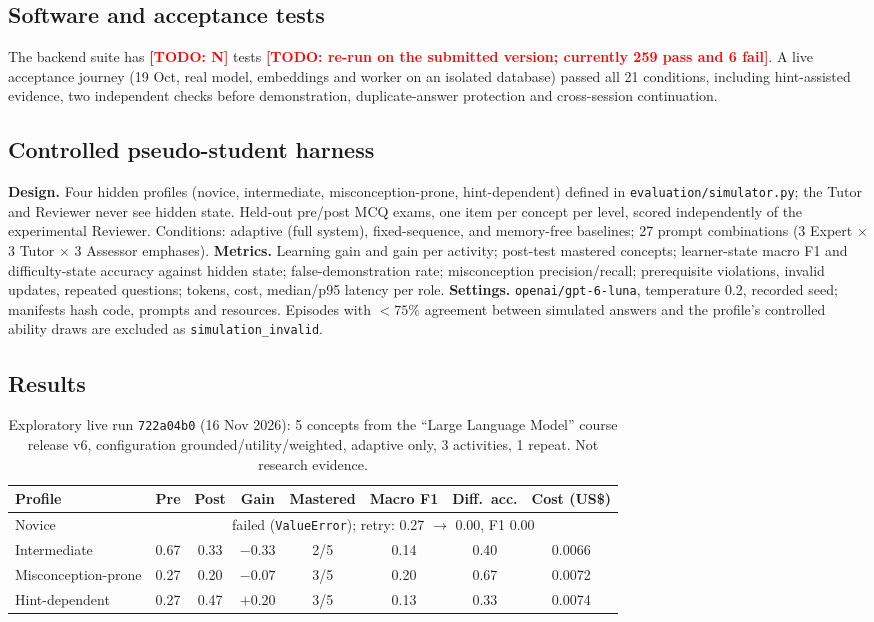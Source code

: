 \documentclass{article}
\newcommand{\todo}[1]{\textcolor{red}{\textbf{[TODO: #1]}}}
\newcommand{\code}[1]{\texttt{\small #1}}
\begin{document}
\subsection{Software and acceptance tests}
The backend suite has \todo{N} tests \todo{re-run on the submitted version; currently 259 pass and 6 fail}. A live acceptance journey (19 Oct, real model, embeddings and worker on an isolated database) passed all 21 conditions, including hint-assisted evidence, two independent checks before demonstration, duplicate-answer protection and cross-session continuation.

\subsection{Controlled pseudo-student harness}
\textbf{Design.} Four hidden profiles (novice, intermediate, misconception-prone, hint-dependent) defined in \code{evaluation/simulator.py}; the Tutor and Reviewer never see hidden state. Held-out pre/post MCQ exams, one item per concept per level, scored independently of the experimental Reviewer. Conditions: adaptive (full system), fixed-sequence, and memory-free baselines; 27 prompt combinations (3 Expert $\times$ 3 Tutor $\times$ 3 Assessor emphases).
\textbf{Metrics.} Learning gain and gain per activity; post-test mastered concepts; learner-state macro F1 and difficulty-state accuracy against hidden state; false-demonstration rate; misconception precision/recall; prerequisite violations, invalid updates, repeated questions; tokens, cost, median/p95 latency per role.
\textbf{Settings.} \code{openai/gpt-6-luna}, temperature 0.2, recorded seed; manifests hash code, prompts and resources. Episodes with $<75\%$ agreement between simulated answers and the profile's controlled ability draws are excluded as \code{simulation\_invalid}.

\subsection{Results}

\begin{table}[H]
\centering
\small
\caption{Exploratory live run \code{722a04b0} (16 Nov 2026): 5 concepts from the ``Large Language Model'' course release v6, configuration grounded/utility/weighted, adaptive only, 3 activities, 1 repeat. Not research evidence.}
\label{tab:explore}
\begin{tabular}{@{}lccccccc@{}}
\toprule
Profile & Pre & Post & Gain & Mastered & Macro F1 & Diff.\ acc. & Cost (US\$) \\
\midrule
Novice & \multicolumn{7}{c}{failed (\code{ValueError}); retry: 0.27 $\rightarrow$ 0.00, F1 0.00} \\
Intermediate & 0.67 & 0.33 & $-0.33$ & 2/5 & 0.14 & 0.40 & 0.0066 \\
Misconception-prone & 0.27 & 0.20 & $-0.07$ & 3/5 & 0.20 & 0.67 & 0.0072 \\
Hint-dependent & 0.27 & 0.47 & $+0.20$ & 3/5 & 0.13 & 0.33 & 0.0074 \\
\bottomrule
\end{tabular}
\end{table}
\end{document}
